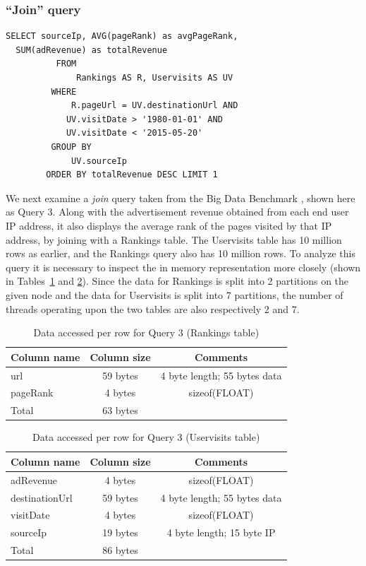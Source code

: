 \documentclass{sig-alternate-05-2015}
\begin{document}
\subsubsection{``Join'' query}

\begin{small}
\begin{Verbatim}[frame=single,label=Query 3]
SELECT sourceIp, AVG(pageRank) as avgPageRank,
  SUM(adRevenue) as totalRevenue 
          FROM 
              Rankings AS R, Uservisits AS UV 
         WHERE 
             R.pageUrl = UV.destinationUrl AND 
            UV.visitDate > '1980-01-01' AND 
            UV.visitDate < '2015-05-20' 
         GROUP BY 
             UV.sourceIp 
        ORDER BY totalRevenue DESC LIMIT 1
\end{Verbatim}
\end{small}

We next examine a {\em join} query taken from the Big Data Benchmark
\cite{bigDataBenchmark}, shown here as Query 3. Along with the advertisement
revenue obtained from each end user IP address, it also displays the average
rank of the pages visited by that IP address, by joining with a Rankings table.
The Uservisits table has 10 million rows as earlier, and the Rankings query
also has 10 million rows.  To analyze this query it is necessary to inspect the
in memory representation more closely (shown in Tables~\ref{tbl:query3a} and
\ref{tbl:query3b}). Since the data for Rankings is split into 2 partitions on
the given node and the data for Uservisits is split into 7 partitions, the
number of threads operating upon the two tables are also respectively 2 and 7.
        
\begin{table}
\begin{tabular}[c]{|l|c|c|}
\hline
Column name & Column size & Comments \\
\hline
url & 59 bytes & 4 byte length; 55 bytes data \\
\hline
pageRank & 4 bytes & sizeof(FLOAT) \\
\hline
Total & 63 bytes & \\
\hline
\end{tabular}
\caption{\label{tbl:query3a}Data accessed per row for Query 3 (Rankings table)}
\end{table}

\begin{table}
\begin{tabular}[c]{|l|c|c|}
 \hline
 Column name & Column size & Comments \\
 \hline
 adRevenue & 4 bytes & sizeof(FLOAT) \\
 destinationUrl & 59 bytes & 4 byte length; 55 bytes data \\
 visitDate & 4 bytes & sizeof(FLOAT) \\
 sourceIp & 19 bytes & 4 byte length; 15 byte IP \\
 \hline
 Total & 86 bytes & \\
 \hline
 \end{tabular}
\caption{\label{tbl:query3b}Data accessed per row for Query 3 (Uservisits table)}
\end{table}
\end{document}
